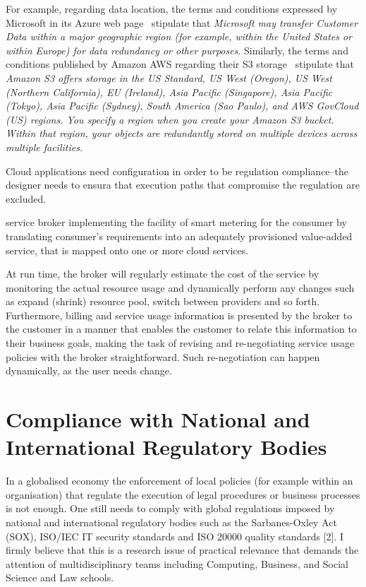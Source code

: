 \documentclass[runningheads,a4paper]{llncs}
\begin{document}
For example, regarding data location, the terms and conditions 
expressed by Microsoft in its Azure web page~\cite{MSAzurePrivacy2014} 
stipulate that \emph{Microsoft may transfer Customer Data within 
a major geographic region (for example, within the United States 
or within Europe) for data redundancy or other purposes}. Similarly,
the terms and conditions published by Amazon AWS regarding their
S3 storage~\cite{AmazonS3faqs2014} stipulate that
\emph{Amazon S3 offers storage in the US Standard, US West (Oregon), 
      US West (Northern California), EU (Ireland), Asia Pacific (Singapore), 
      Asia Pacific (Tokyo), Asia Pacific (Sydney), South America (Sao Paulo), 
      and AWS GovCloud (US) regions. You specify a region when you create 
      your Amazon S3 bucket. Within that region, your objects are redundantly 
      stored on multiple devices across multiple facilities.}

 

Cloud applications need configuration in order to be regulation
compliance--the designer needs to ensura that execution paths
that compromise the regulation are excluded.

service broker implementing the facility of smart metering for the consumer by
translating consumer’s requirements into an adequately provisioned value-added service, that is mapped
onto one or more cloud services. 

At run time, the broker will regularly estimate the cost of the service by
monitoring the actual resource usage and dynamically perform any changes such as expand (shrink)
resource pool, switch between providers and so forth. Furthermore, billing and service usage information is
presented by the broker to the customer in a manner that enables the customer to relate this information to
their business goals, making the task of revising and re-negotiating service usage policies with the broker
straightforward. Such re-negotiation can happen dynamically, as the user needs change.




\section{Compliance with National and International Regulatory Bodies}
In a globalised economy the enforcement of local policies (for example within an organisation) that regulate the execution of legal procedures or business processes is not enough. One still needs to comply with global regulations imposed by national and international regulatory bodies such as the Sarbanes-Oxley Act (SOX), ISO/IEC IT security standards and ISO 20000 quality standards [2]. I firmly believe that this is a research issue of practical relevance that demands the attention of multidisciplinary teams including Computing, Business, and Social Science and Law schools. 
\end{document}
